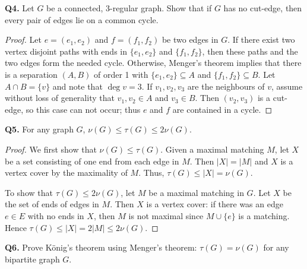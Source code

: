 \noindent \textbf{Q4.} Let \( G \) be a connected, 3-regular graph. Show that if \( G \) has no cut-edge, then every pair of edges lie on a common cycle.
\begin{proof}
Let \( e = (e_1, e_2) \) and \( f = (f_1, f_2) \) be two edges in \( G \). If there exist two vertex disjoint paths with ends in \( \{ e_1, e_2 \}  \) and \( \{ f_1, f_2 \}  \), then these paths and the two edges form the needed cycle. Otherwise, Menger's theorem implies that there is a separation \( (A,B) \) of order 1 with \( \{ e_1, e_2 \} \subseteq A \) and \( \{ f_1, f_2 \} \subseteq B \). Let \( A \cap B = \{ v \}  \) and note that \( \deg v = 3 \). If \( v_1, v_2, v_3 \) are the neighbours of \( v \), assume without loss of generality that \( v_1, v_2 \in A \) and \( v_3 \in B \). Then \( (v_2, v_3) \) is a cut-edge, so this case can not occur; thus \( e \) and \( f \) are contained in a cycle.
\end{proof}
\noindent \textbf{Q5.} For any graph \( G \), \( \nu (G) \leq \tau (G) \leq 2 \nu (G) \).
\begin{proof}
We first show that \( \nu (G) \leq \tau (G) \). Given a maximal matching \( M \), let \( X \) be a set consisting of one end from each edge in \( M \). Then \( |X| = |M| \) and \( X \) is a vertex cover by the maximality of \( M \). Thus, \( \tau (G) \leq |X| = \nu (G) \).

To show that \( \tau (G) \leq 2 \nu (G) \), let \( M \) be a maximal matching in \( G \). Let \( X \) be the set of ends of edges in \( M \). Then \( X \) is a vertex cover: if there was an edge \( e \in E \) with no ends in \( X \), then \( M \) is not maximal since \( M \cup \{ e \}  \) is a matching. Hence \( \tau (G) \leq |X| = 2 |M| \leq 2 \nu (G) \).
\end{proof}
\noindent \textbf{Q6.} Prove K\"onig's theorem using Menger's theorem: \( \tau (G) = \nu (G) \) for any bipartite graph \( G \).
